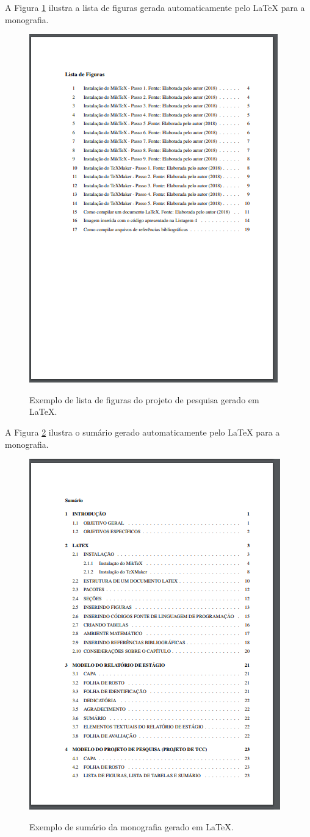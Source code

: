 \newpage
A Figura \ref{listafigmon} ilustra a lista de figuras gerada automaticamente pelo LaTeX para a monografia.\\
\begin{figure}[h]
	\centering
	\includegraphics{imagens/monografia/ListaFig.png}\\
	\caption{Exemplo de lista de figuras do projeto de pesquisa gerado em LaTeX.}
	\label{listafigmon}
\end{figure}

\newpage
A Figura \ref{summon} ilustra o sumário gerado automaticamente pelo LaTeX para a monografia.\\
\begin{figure}[h]
	\centering
	\includegraphics{imagens/monografia/Sumario.png}\\
	\caption{Exemplo de sumário da monografia gerado em LaTeX.}
	\label{summon}
\end{figure}